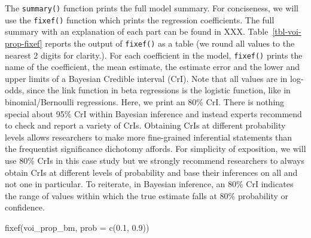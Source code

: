 \documentclass[
  authoryear,
  preprint,
  3p]{elsarticle}
\newenvironment{Shaded}{\begin{snugshade}}{\end{snugshade}}
\newcommand{\AttributeTok}[1]{\textcolor[rgb]{0.40,0.45,0.13}{#1}}
\newcommand{\FloatTok}[1]{\textcolor[rgb]{0.68,0.00,0.00}{#1}}
\newcommand{\FunctionTok}[1]{\textcolor[rgb]{0.28,0.35,0.67}{#1}}
\newcommand{\NormalTok}[1]{\textcolor[rgb]{0.00,0.23,0.31}{#1}}
\begin{document}
The \texttt{summary()} function prints the full model summary. For
conciseness, we will use the \texttt{fixef()} function which prints the
regression coefficients. The full summary with an explanation of each
part can be found in XXX. Table~\ref{tbl-voi-prop-fixef} reports the
output of \texttt{fixef()} as a table (we round all values to the
nearest 2 digits for clarity.). For each coefficient in the model,
\texttt{fixef()} prints the name of the coefficient, the mean estimate,
the estimate error and the lower and upper limits of a Bayesian Credible
interval (CrI). Note that all values are in log-odds, since the link
function in beta regressions is the logistic function, like in
binomial/Bernoulli regressions. Here, we print an 80\% CrI. There is
nothing special about 95\% CrI within Bayesian inference and instead
experts recommend to check and report a variety of CrIs. Obtaining CrIs
at different probability levels allows researchers to make more
fine-grained inferential statements than the frequentist significance
dichotomy affords. For simplicity of exposition, we will use 80\% CrIs
in this case study but we strongly recommend researchers to always
obtain CrIs at different levels of probability and base their inferences
on all and not one in particular. To reiterate, in Bayesian inference,
an 80\% CrI indicates the range of values within which the true estimate
falls at 80\% probability or confidence.

\begin{Shaded}
\begin{Highlighting}[]
\FunctionTok{fixef}\NormalTok{(voi\_prop\_bm, }\AttributeTok{prob =} \FunctionTok{c}\NormalTok{(}\FloatTok{0.1}\NormalTok{, }\FloatTok{0.9}\NormalTok{))}
\end{Highlighting}
\end{Shaded}
\end{document}
